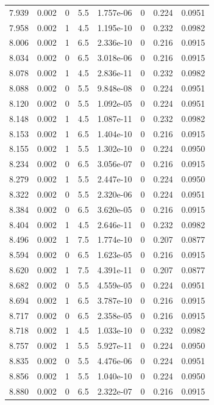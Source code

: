 \documentclass[preview]{standalone}
\begin{document}
{{{{{\begin{tabular}{L{1.2cm}C{1.2cm} C{0.3cm}C{0.5cm} C{1.4cm}C{1.4cm} C{1.4cm}C{1.4cm}}
  7.939  &  0.002  & 0     & 5.5 &  1.757e-06  & 0  & 0.224 &  0.0951   \\ 
  7.958  &  0.002  & 1     & 4.5 &  1.195e-10  & 0  & 0.232 &  0.0982   \\ 
  8.006  &  0.002  & 1     & 6.5 &  2.336e-10  & 0  & 0.216 &  0.0915   \\ 
  8.034  &  0.002  & 0     & 6.5 &  3.018e-06  & 0  & 0.216 &  0.0915   \\ 
  8.078  &  0.002  & 1     & 4.5 &  2.836e-11  & 0  & 0.232 &  0.0982   \\ 
  8.088  &  0.002  & 0     & 5.5 &  9.848e-08  & 0  & 0.224 &  0.0951   \\ 
  8.120  &  0.002  & 0     & 5.5 &  1.092e-05  & 0  & 0.224 &  0.0951   \\ 
  8.148  &  0.002  & 1     & 4.5 &  1.087e-11  & 0  & 0.232 &  0.0982   \\ 
  8.153  &  0.002  & 1     & 6.5 &  1.404e-10  & 0  & 0.216 &  0.0915   \\ 
  8.155  &  0.002  & 1     & 5.5 &  1.302e-10  & 0  & 0.224 &  0.0950   \\ 
  8.234  &  0.002  & 0     & 6.5 &  3.056e-07  & 0  & 0.216 &  0.0915   \\ 
  8.279  &  0.002  & 1     & 5.5 &  2.447e-10  & 0  & 0.224 &  0.0950   \\ 
  8.322  &  0.002  & 0     & 5.5 &  2.320e-06  & 0  & 0.224 &  0.0951   \\ 
  8.384  &  0.002  & 0     & 6.5 &  3.620e-05  & 0  & 0.216 &  0.0915   \\ 
  8.404  &  0.002  & 1     & 4.5 &  2.646e-11  & 0  & 0.232 &  0.0982   \\ 
  8.496  &  0.002  & 1     & 7.5 &  1.774e-10  & 0  & 0.207 &  0.0877   \\ 
  8.594  &  0.002  & 0     & 6.5 &  1.623e-05  & 0  & 0.216 &  0.0915   \\ 
  8.620  &  0.002  & 1     & 7.5 &  4.391e-11  & 0  & 0.207 &  0.0877   \\ 
  8.682  &  0.002  & 0     & 5.5 &  4.559e-05  & 0  & 0.224 &  0.0951   \\ 
  8.694  &  0.002  & 1     & 6.5 &  3.787e-10  & 0  & 0.216 &  0.0915   \\ 
  8.717  &  0.002  & 0     & 6.5 &  2.358e-05  & 0  & 0.216 &  0.0915   \\ 
  8.718  &  0.002  & 1     & 4.5 &  1.033e-10  & 0  & 0.232 &  0.0982   \\ 
  8.757  &  0.002  & 1     & 5.5 &  5.927e-11  & 0  & 0.224 &  0.0950   \\ 
  8.835  &  0.002  & 0     & 5.5 &  4.476e-06  & 0  & 0.224 &  0.0951   \\ 
  8.856  &  0.002  & 1     & 5.5 &  1.040e-10  & 0  & 0.224 &  0.0950   \\ 
  8.880  &  0.002  & 0     & 6.5 &  2.322e-07  & 0  & 0.216 &  0.0915   \\ 
\hline 
\end{tabular} 

}}}}}
\end{document}
